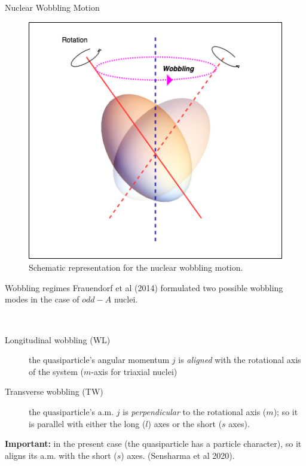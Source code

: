 \documentclass{beamer}
\begin{document}
\begin{frame}{Nuclear Wobbling Motion}
      \begin{figure}
          \centering
          \includegraphics[scale=0.45]{figs/wobbling_drawing.png}
          \caption{Schematic representation for the nuclear wobbling motion.}
          \label{wobbling_picture}
      \end{figure}
\end{frame}


\begin{frame}{Wobbling regimes}
  Frauendorf et al (2014) formulated two possible wobbling modes in the case of $odd-A$ nuclei.
  \begin{block}{$\ $}
    \begin{description}
      \item[Longitudinal wobbling (WL)] the quasiparticle's angular momentum $j$ is \emph{aligned} with the rotational axis of the system ($m$-axis for triaxial nuclei)
      \item[Transverse wobbling (TW)] the quasiparticle's a.m. $j$ is \emph{perpendicular} to the rotational axis ($m$); so it is parallel with either the long ($l$) axes or the short ($s$ axes). 
    \end{description}
  \end{block}
  \textbf{Important:} in the present case (the quasiparticle has a particle character), so it aligns its a.m. with the short ($s$) axes. (Sensharma et al 2020).
\end{frame}
\end{document}
